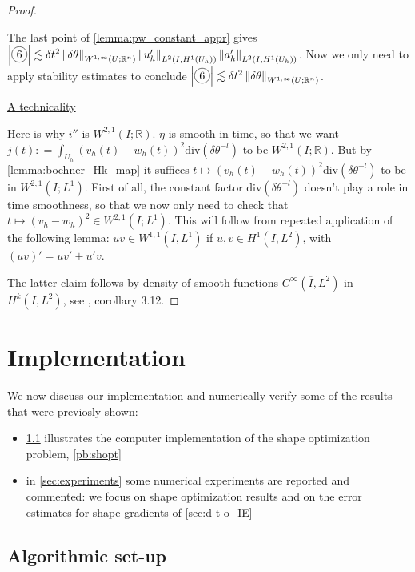 \documentclass[english,a4paper,10pt,oneside]{scrbook}	%
\theoremstyle{break}
\newenvironment{mproof}[1][\proofname]{%
  \begin{proof}[#1]$ $\par\nobreak\ignorespaces
}{%
  \end{proof}
}
\renewcommand*{\proofname}{Proof}
\theoremstyle{remark}
\newcommand{\mR}{\mathbb{R}}
\newcommand{\ds}{\displaystyle}
\newcommand{\norm}[1]{\left\lVert#1\right\rVert}
\newcommand{\te}{\theta}
\newcommand{\dive}{\text{div}}
\newcommand*\circled[1]{\tikz[baseline=(char.base)]{
            \node[shape=circle,draw,inner sep=2pt] (char) {#1};}}
\begin{document}
\begin{mproof}
The last point of \cref{lemma:pw_constant_appr} gives $\left | \circled{6} \right | \lesssim \delta t^2\norm{\delta \te}_{W^{1,\infty}(U;\mR^n)} \norm{u_h'}_{L^2(I,H^1(U_h))}\norm{a_h'}_{L^2(I,H^1(U_h))}$. Now we only need to apply stability estimates to conclude  $\left | \circled{6} \right | \lesssim \delta t^2 \norm{\delta \te}_{W^{1,\infty}(U;\mR^n)}$.

\underline{A technicality}

Here is why $i''$ is $W^{2,1}(I;\mR)$. $\eta$ is smooth in time, so that we want $j(t): = \ds \int_{U_h}(v_h(t)-w_h(t))^2\dive(\delta \te^{-l})$ to be $W^{2,1}(I;\mR)$. But by \cref{lemma:bochner_Hk_map} it suffices $t \mapsto (v_h(t)-w_h(t))^2\dive(\delta \te^{-l})$ to be in $W^{2,1}(I;L^1)$. First of all, the constant factor $\dive(\delta \te^{-l})$ doesn't play a role in time smoothness, so that we now only need to check that $t \mapsto (v_h-w_h)^2\in W^{2,1}(I;L^1)$. This will follow from repeated application of the following lemma: $u v \in W^{1,1}(I,L^1)$ if $u,v \in H^1(I,L^2)$, with $(uv)' = uv'+u'v$.

The latter claim follows by density of smooth functions $C^{\infty}(\overline{I}, L^2)$ in $H^k(I,L^2)$, see \cite{kreuter}, corollary 3.12.
\end{mproof}

\chapter{Implementation}
\label{chap:num_exp}

We now discuss our implementation and numerically verify some of the results that were previosly shown:

\begin{itemize}
	\item \cref{sec:implementation} illustrates the computer implementation of the shape optimization problem, \cref{pb:shopt}
	\item in \cref{sec:experiments} some numerical experiments are reported and commented: we focus on shape optimization results and on the error estimates for shape gradients of \cref{sec:d-t-o_IE}
\end{itemize}

\section{Algorithmic set-up}
\label{sec:implementation}
\end{document}
